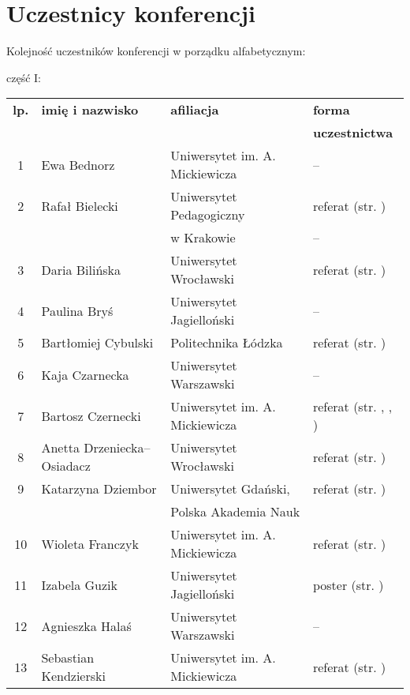 \documentclass[12pt,oneside]{book}
\begin{document}
\chapter{Uczestnicy konferencji}

Kolejność uczestników konferencji w porządku alfabetycznym:

\vspace{1cm}

\Large część I:

\normalsize
\begin{tabular}{||c|l|l|l||}
\hline
\hline
\textbf{lp.} & \textbf{imię i nazwisko} & \textbf{afiliacja} & \textbf{forma}\\
 &  &  & \textbf{uczestnictwa}\\
\hline
\hline
\hline
1	 & Ewa Bednorz & Uniwersytet im. A. Mickiewicza & -- \\\hline
2	 & Rafał Bielecki & Uniwersytet Pedagogiczny & referat (str. \pageref{bielecki})\\
	 &  & w Krakowie & -- \\\hline
3	 & Daria Bilińska & Uniwersytet Wrocławski & referat (str. \pageref{bilinska}) \\\hline
4	 & Paulina Bryś & Uniwersytet Jagielloński & -- \\\hline
5	 & Bartłomiej Cybulski & Politechnika Łódzka & referat (str. \pageref{cybulski}) \\\hline
6	 & Kaja Czarnecka & Uniwersytet Warszawski & -- \\\hline
7	 & Bartosz Czernecki & Uniwersytet im. A. Mickiewicza & referat (str. \pageref{kolendowicz}, \pageref{taszarek}, \pageref{pilguj}) \\\hline
8	 & Anetta Drzeniecka--Osiadacz & Uniwersytet Wrocławski & referat (str. \pageref{bilinska}) \\\hline
9 	 & Katarzyna Dziembor & Uniwersytet Gdański, & referat (str. \pageref{dziembor})\\
		 &  & Polska Akademia Nauk &  \\\hline
10	 & Wioleta Franczyk & Uniwersytet im. A. Mickiewicza & referat  (str. \pageref{franczyk})\\\hline
11	 & Izabela Guzik & Uniwersytet Jagielloński & poster (str. \pageref{guzik})\\\hline	
 12	 & Agnieszka Halaś & Uniwersytet Warszawski & -- \\\hline	
 13 & Sebastian Kendzierski & Uniwersytet im. A. Mickiewicza & referat (str. \pageref{kendzierski}) \\\hline

\end{tabular}
\end{document}
